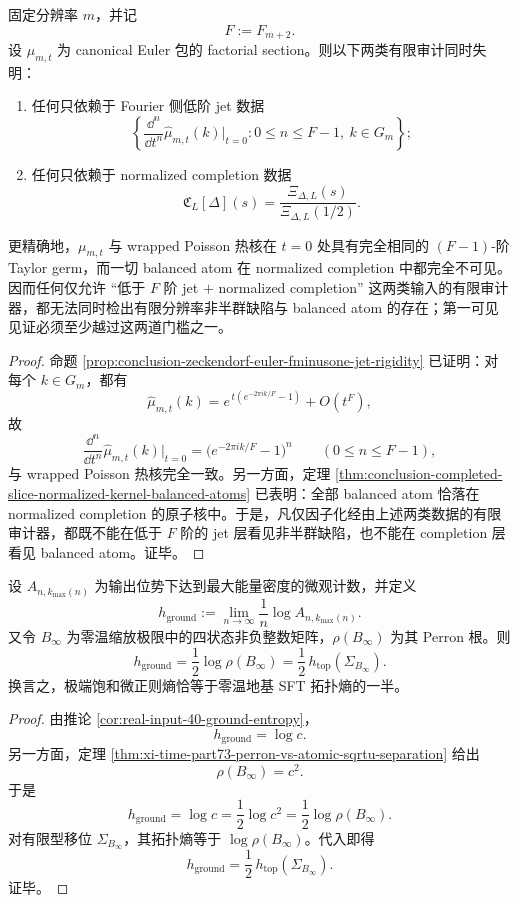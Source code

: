 \begin{theorem}\label{thm:conclusion-zeckendorf-euler-lowjet-completion-doubleblind}
固定分辨率 \(m\)，并记
\[
F:=F_{m+2}.
\]
设 \(\mu_{m,t}\) 为 canonical Euler 包的 factorial section。则以下两类有限审计同时失明：
\begin{enumerate}
  \item 任何只依赖于 Fourier 侧低阶 jet 数据
  \[
  \left\{
  \frac{\dd^n}{\dd t^n}\widehat\mu_{m,t}(k)\Big|_{t=0}
  :
  0\le n\le F-1,\ k\in G_m
  \right\};
  \]
  \item 任何只依赖于 normalized completion 数据
  \[
  \mathfrak C_L[\Delta](s)=\frac{\Xi_{\Delta,L}(s)}{\Xi_{\Delta,L}(1/2)}.
  \]
\end{enumerate}
更精确地，\(\mu_{m,t}\) 与 wrapped Poisson 热核在 \(t=0\) 处具有完全相同的 \((F-1)\)-阶 Taylor germ，而一切 balanced atom 在 normalized completion 中都完全不可见。因而任何仅允许 ``低于 \(F\) 阶 jet \(+\) normalized completion'' 这两类输入的有限审计器，都无法同时检出有限分辨率非半群缺陷与 balanced atom 的存在；第一可见见证必须至少越过这两道门槛之一。
\end{theorem}
\begin{proof}
命题 \ref{prop:conclusion-zeckendorf-euler-fminusone-jet-rigidity} 已证明：对每个 \(k\in G_m\)，都有
\[
\widehat\mu_{m,t}(k)
=
e^{\,t(e^{-2\pi ik/F}-1)}+O(t^F),
\]
故
\[
\frac{\dd^n}{\dd t^n}\widehat\mu_{m,t}(k)\Big|_{t=0}
=
\bigl(e^{-2\pi ik/F}-1\bigr)^n
\qquad
(0\le n\le F-1),
\]
与 wrapped Poisson 热核完全一致。另一方面，定理 \ref{thm:conclusion-completed-slice-normalized-kernel-balanced-atoms} 已表明：全部 balanced atom 恰落在 normalized completion 的原子核中。于是，凡仅因子化经由上述两类数据的有限审计器，都既不能在低于 \(F\) 阶的 jet 层看见非半群缺陷，也不能在 completion 层看见 balanced atom。证毕。
\end{proof}

\begin{theorem}\label{thm:conclusion-realinput40-ground-entropy-half-topological-entropy}
设 \(A_{n,k_{\max}(n)}\) 为输出位势下达到最大能量密度的微观计数，并定义
\[
h_{\mathrm{ground}}
:=
\lim_{n\to\infty}\frac1n\log A_{n,k_{\max}(n)}.
\]
又令 \(B_\infty\) 为零温缩放极限中的四状态非负整数矩阵，\(\rho(B_\infty)\) 为其 Perron 根。则
\[
h_{\mathrm{ground}}
=
\frac12\log \rho(B_\infty)
=
\frac12\,h_{\mathrm{top}}(\Sigma_{B_\infty}).
\]
换言之，极端饱和微正则熵恰等于零温地基 SFT 拓扑熵的一半。
\end{theorem}
\begin{proof}
由推论 \ref{cor:real-input-40-ground-entropy}，
\[
h_{\mathrm{ground}}=\log c.
\]
另一方面，定理 \ref{thm:xi-time-part73-perron-vs-atomic-sqrtu-separation} 给出
\[
\rho(B_\infty)=c^2.
\]
于是
\[
h_{\mathrm{ground}}=\log c=\frac12\log c^2=\frac12\log\rho(B_\infty).
\]
对有限型移位 \(\Sigma_{B_\infty}\)，其拓扑熵等于 \(\log\rho(B_\infty)\)。代入即得
\[
h_{\mathrm{ground}}=\frac12\,h_{\mathrm{top}}(\Sigma_{B_\infty}).
\]
证毕。
\end{proof}

